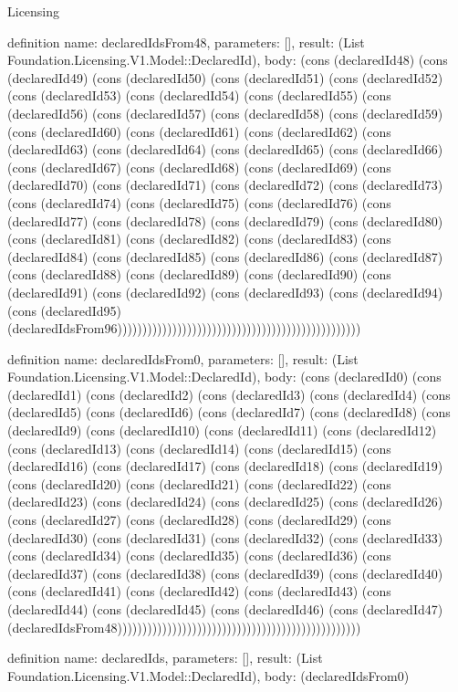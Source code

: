 \begin{lexlean}{Licensing}
\begin{semanticmodule}
definition{
  name: declaredIdsFrom48,
  parameters: [],
  result: (List Foundation.Licensing.V1.Model::DeclaredId),
  body: (cons (declaredId48) (cons (declaredId49) (cons (declaredId50) (cons (declaredId51) (cons (declaredId52) (cons (declaredId53) (cons (declaredId54) (cons (declaredId55) (cons (declaredId56) (cons (declaredId57) (cons (declaredId58) (cons (declaredId59) (cons (declaredId60) (cons (declaredId61) (cons (declaredId62) (cons (declaredId63) (cons (declaredId64) (cons (declaredId65) (cons (declaredId66) (cons (declaredId67) (cons (declaredId68) (cons (declaredId69) (cons (declaredId70) (cons (declaredId71) (cons (declaredId72) (cons (declaredId73) (cons (declaredId74) (cons (declaredId75) (cons (declaredId76) (cons (declaredId77) (cons (declaredId78) (cons (declaredId79) (cons (declaredId80) (cons (declaredId81) (cons (declaredId82) (cons (declaredId83) (cons (declaredId84) (cons (declaredId85) (cons (declaredId86) (cons (declaredId87) (cons (declaredId88) (cons (declaredId89) (cons (declaredId90) (cons (declaredId91) (cons (declaredId92) (cons (declaredId93) (cons (declaredId94) (cons (declaredId95) (declaredIdsFrom96)))))))))))))))))))))))))))))))))))))))))))))))))
}

definition{
  name: declaredIdsFrom0,
  parameters: [],
  result: (List Foundation.Licensing.V1.Model::DeclaredId),
  body: (cons (declaredId0) (cons (declaredId1) (cons (declaredId2) (cons (declaredId3) (cons (declaredId4) (cons (declaredId5) (cons (declaredId6) (cons (declaredId7) (cons (declaredId8) (cons (declaredId9) (cons (declaredId10) (cons (declaredId11) (cons (declaredId12) (cons (declaredId13) (cons (declaredId14) (cons (declaredId15) (cons (declaredId16) (cons (declaredId17) (cons (declaredId18) (cons (declaredId19) (cons (declaredId20) (cons (declaredId21) (cons (declaredId22) (cons (declaredId23) (cons (declaredId24) (cons (declaredId25) (cons (declaredId26) (cons (declaredId27) (cons (declaredId28) (cons (declaredId29) (cons (declaredId30) (cons (declaredId31) (cons (declaredId32) (cons (declaredId33) (cons (declaredId34) (cons (declaredId35) (cons (declaredId36) (cons (declaredId37) (cons (declaredId38) (cons (declaredId39) (cons (declaredId40) (cons (declaredId41) (cons (declaredId42) (cons (declaredId43) (cons (declaredId44) (cons (declaredId45) (cons (declaredId46) (cons (declaredId47) (declaredIdsFrom48)))))))))))))))))))))))))))))))))))))))))))))))))
}

definition{
  name: declaredIds,
  parameters: [],
  result: (List Foundation.Licensing.V1.Model::DeclaredId),
  body: (declaredIdsFrom0)
}


\end{semanticmodule}
\end{lexlean}

